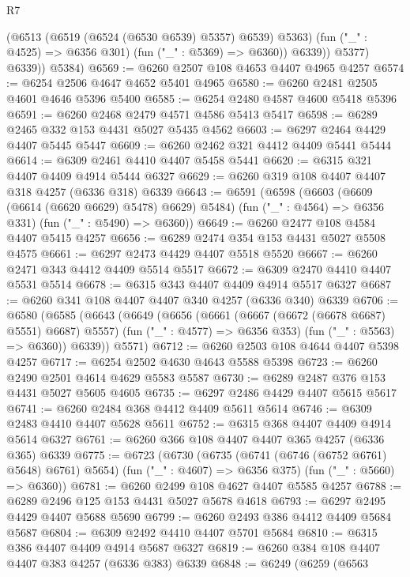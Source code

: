 \begin{lexlean}{R7}
\begin{coremodule}
                  (@6513 (@6519 (@6524 (@6530 @6539) @5357) @6539) @5363)
                  (fun ("_" : @4525) => @6356 @301)
                  (fun ("_" : @5369) => @6360))
                @6339))
            @5377)
          @6339))
      @5384)
@6569 := @6260 @2507 @108 @4653 @4407 @4965 @4257
@6574 := @6254 @2506 @4647 @4652 @5401 @4965
@6580 := @6260 @2481 @2505 @4601 @4646 @5396 @5400
@6585 := @6254 @2480 @4587 @4600 @5418 @5396
@6591 := @6260 @2468 @2479 @4571 @4586 @5413 @5417
@6598 := @6289 @2465 @332 @153 @4431 @5027 @5435 @4562
@6603 := @6297 @2464 @4429 @4407 @5445 @5447
@6609 := @6260 @2462 @321 @4412 @4409 @5441 @5444
@6614 := @6309 @2461 @4410 @4407 @5458 @5441
@6620 := @6315 @321 @4407 @4409 @4914 @5444 @6327
@6629 := @6260 @319 @108 @4407 @4407 @318 @4257 (@6336 @318) @6339
@6643 := @6591
    (@6598
      (@6603 (@6609 (@6614 (@6620 @6629) @5478) @6629) @5484)
      (fun ("_" : @4564) => @6356 @331)
      (fun ("_" : @5490) => @6360))
@6649 := @6260 @2477 @108 @4584 @4407 @5415 @4257
@6656 := @6289 @2474 @354 @153 @4431 @5027 @5508 @4575
@6661 := @6297 @2473 @4429 @4407 @5518 @5520
@6667 := @6260 @2471 @343 @4412 @4409 @5514 @5517
@6672 := @6309 @2470 @4410 @4407 @5531 @5514
@6678 := @6315 @343 @4407 @4409 @4914 @5517 @6327
@6687 := @6260 @341 @108 @4407 @4407 @340 @4257 (@6336 @340) @6339
@6706 := @6580
    (@6585
      (@6643
        (@6649
          (@6656
            (@6661 (@6667 (@6672 (@6678 @6687) @5551) @6687) @5557)
            (fun ("_" : @4577) => @6356 @353)
            (fun ("_" : @5563) => @6360))
          @6339))
      @5571)
@6712 := @6260 @2503 @108 @4644 @4407 @5398 @4257
@6717 := @6254 @2502 @4630 @4643 @5588 @5398
@6723 := @6260 @2490 @2501 @4614 @4629 @5583 @5587
@6730 := @6289 @2487 @376 @153 @4431 @5027 @5605 @4605
@6735 := @6297 @2486 @4429 @4407 @5615 @5617
@6741 := @6260 @2484 @368 @4412 @4409 @5611 @5614
@6746 := @6309 @2483 @4410 @4407 @5628 @5611
@6752 := @6315 @368 @4407 @4409 @4914 @5614 @6327
@6761 := @6260 @366 @108 @4407 @4407 @365 @4257 (@6336 @365) @6339
@6775 := @6723
    (@6730
      (@6735 (@6741 (@6746 (@6752 @6761) @5648) @6761) @5654)
      (fun ("_" : @4607) => @6356 @375)
      (fun ("_" : @5660) => @6360))
@6781 := @6260 @2499 @108 @4627 @4407 @5585 @4257
@6788 := @6289 @2496 @125 @153 @4431 @5027 @5678 @4618
@6793 := @6297 @2495 @4429 @4407 @5688 @5690
@6799 := @6260 @2493 @386 @4412 @4409 @5684 @5687
@6804 := @6309 @2492 @4410 @4407 @5701 @5684
@6810 := @6315 @386 @4407 @4409 @4914 @5687 @6327
@6819 := @6260 @384 @108 @4407 @4407 @383 @4257 (@6336 @383) @6339
@6848 := @6249
    (@6259
      (@6563

\end{coremodule}
\end{lexlean}
